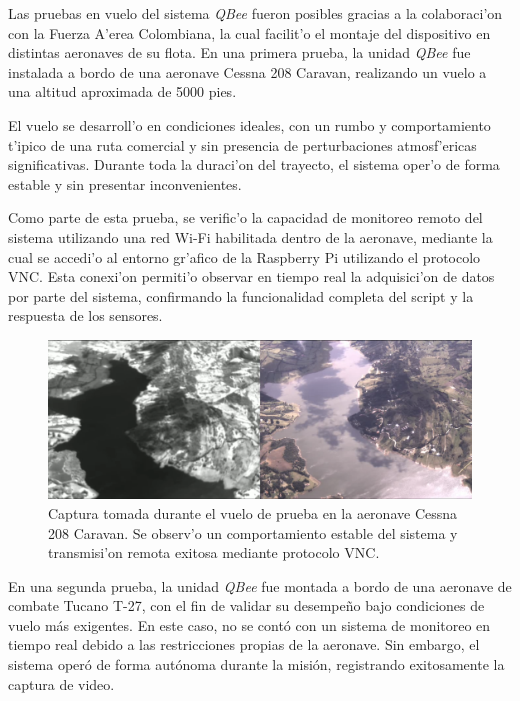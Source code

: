     Las pruebas en vuelo del sistema \textit{QBee} fueron posibles gracias a la colaboraci'on con la Fuerza A'erea Colombiana, la cual facilit'o el montaje del dispositivo en distintas aeronaves de su flota. En una primera prueba, la unidad \textit{QBee} fue instalada a bordo de una aeronave Cessna 208 Caravan, realizando un vuelo a una altitud aproximada de 5000 pies.
    
    \noindent El vuelo se desarroll'o en condiciones ideales, con un rumbo y comportamiento t'ipico de una ruta comercial y sin presencia de perturbaciones atmosf'ericas significativas. Durante toda la duraci'on del trayecto, el sistema oper'o de forma estable y sin presentar inconvenientes.
    
    \noindent Como parte de esta prueba, se verific'o la capacidad de monitoreo remoto del sistema utilizando una red Wi-Fi habilitada dentro de la aeronave, mediante la cual se accedi'o al entorno gr'afico de la Raspberry Pi utilizando el protocolo VNC. Esta conexi'on permiti'o observar en tiempo real la adquisici'on de datos por parte del sistema, confirmando la funcionalidad completa del script y la respuesta de los sensores.
    
    \begin{figure}[!h]
    \centering
    \includegraphics[width=1\textwidth]{Figures/C4/vuelo_caravan.png}
    \caption{Captura tomada durante el vuelo de prueba en la aeronave Cessna 208 Caravan. Se observ'o un comportamiento estable del sistema y transmisi'on remota exitosa mediante protocolo VNC.}
    \label{fig:prueba_vuelo}
    \end{figure}

    \noindent En una segunda prueba, la unidad \textit{QBee} fue montada a bordo de una aeronave de combate Tucano T-27, con el fin de validar su desempeño bajo condiciones de vuelo más exigentes. En este caso, no se contó con un sistema de monitoreo en tiempo real debido a las restricciones propias de la aeronave. Sin embargo, el sistema operó de forma autónoma durante la misión, registrando exitosamente la captura de video.

